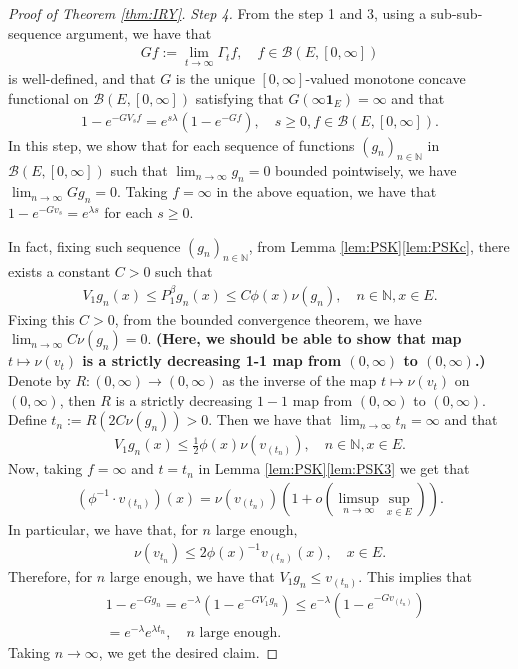 \documentclass[12pt,a4paper]{amsart}
\numberwithin{equation}{section}
\theoremstyle{plain}
\theoremstyle{definition}
\begin{document}
\begin{proof}[Proof of Theorem \ref{thm:IRY}]
\emph{Step 4.}
From the step 1 and 3, using a sub-sub-sequence argument, we have that 
\begin{align}
  \label{eq:Y:1}
	Gf
  := \lim_{t\to \infty} \Gamma_tf, \quad f\in \mathcal B(E,[0,\infty])
\end{align}
is well-defined, and that $G$ is the unique $[0,\infty]$-valued monotone concave functional on $\mathcal B(E,[0,\infty])$ satisfying that $G(\infty \mathbf 1_E) = \infty$ and that
\begin{align}
  1 - e^{- G V_sf} = e^{s\lambda} (1- e^{- G f}),
  \quad s \geq 0, f \in \mathcal B(E, [0,\infty]).
\end{align}
In this step, we show that for each sequence of functions $(g_{n})_{n\in \mathbb N}$ in $\mathcal B(E, [0,\infty])$ such that $\lim_{n \to \infty} g_n = 0$ bounded pointwisely, we have $\lim_{n \to \infty} G g_n = 0$.
Taking $f = \infty$ in the above equation, we have that $1 - e^{- Gv_s} = e^{\lambda s}$ for each $s\geq 0$.

In fact, fixing such sequence $(g_{n})_{n\in \mathbb N}$, from Lemma \ref{lem:PSK}\ref{lem:PSKc}, there exists a constant $C > 0$ such that 
\begin{align}
	V_1 g_n(x) \leq P^\beta_1 g_n(x) \leq C \phi(x) \nu(g_n),
  \quad n \in \mathbb N, x\in E.
\end{align}
Fixing this $C>0$, from the bounded convergence theorem, we have $\lim_{n\to \infty}C \nu(g_n) =0$.
{\bf (Here, we should be able to show that map $t \mapsto \nu(v_t)$ is a strictly decreasing 1-1 map from $(0,\infty)$ to $(0,\infty)$.)}
Denote by $R:(0,\infty) \to (0,\infty)$ as the inverse of the map $t \mapsto \nu(v_t)$ on $(0,\infty)$, then $R$ is a strictly decreasing $1-1$ map from $(0,\infty)$ to $(0,\infty)$. 
Define $t_n := R(2C\nu(g_n))> 0$.
Then we have that $\lim_{n\to \infty} t_n = \infty$ and that 
\begin{align}
	V_1 g_n(x) \leq \frac{1}{2} \phi(x) \nu(v_{(t_n)}), 
\quad n \in \mathbb N, x\in E.
\end{align}
Now, taking $f = \infty$ and $t = t_n$ in Lemma \ref{lem:PSK}\eqref{lem:PSK3} we get that
\begin{align}
 (\phi^{-1} \cdot v_{(t_n)})(x) 
  = \nu(v_{(t_n)}) ( 1+ o(\limsup_{n\to \infty} \sup_{x\in E}) ).
\end{align}
In particular, we have that, for $n$ large enough,
\begin{align}
	\nu(v_{t_n}) \leq 2 \phi(x)^{-1} v_{(t_n)}(x), \quad x\in E.
\end{align}
Therefore, for $n$ large enough, we have that $V_1g_n \leq v_{(t_n)}$.
This implies that
\begin{align}
	& 1 - e^{- Gg_n}
  = e^{- \lambda} (1- e^{- GV_1g_n})
  \leq e^{- \lambda} (1- e^{- G v_{(t_n)}}) \\
  & = e^{- \lambda} e^{\lambda t_n},
  \quad \text{$n$ large enough.}
\end{align} 
Taking $n\to \infty$, we get the desired claim.


\end{proof}
\end{document}
